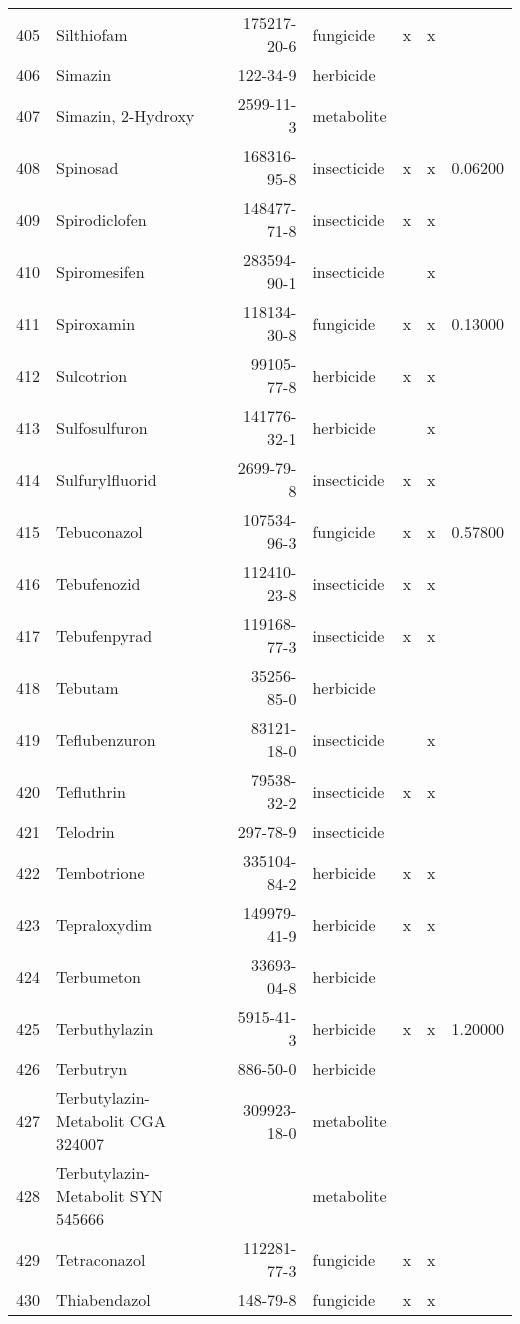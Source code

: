 \begin{longtable}{lp{3cm}rlp{1cm}p{1cm}p{1.5cm}}
  405 & Silthiofam & 175217-20-6 & fungicide & x & x &  \\ 
  406 & Simazin & 122-34-9 & herbicide &  &  &  \\ 
  407 & Simazin, 2-Hydroxy & 2599-11-3 & metabolite &  &  &  \\ 
  408 & Spinosad & 168316-95-8 & insecticide & x & x & 0.06200 \\ 
  409 & Spirodiclofen & 148477-71-8 & insecticide & x & x &  \\ 
  410 & Spiromesifen & 283594-90-1 & insecticide &  & x &  \\ 
  411 & Spiroxamin & 118134-30-8 & fungicide & x & x & 0.13000 \\ 
  412 & Sulcotrion & 99105-77-8 & herbicide & x & x &  \\ 
  413 & Sulfosulfuron & 141776-32-1 & herbicide &  & x &  \\ 
  414 & Sulfurylfluorid & 2699-79-8 & insecticide & x & x &  \\ 
  415 & Tebuconazol & 107534-96-3 & fungicide & x & x & 0.57800 \\ 
  416 & Tebufenozid & 112410-23-8 & insecticide & x & x &  \\ 
  417 & Tebufenpyrad & 119168-77-3 & insecticide & x & x &  \\ 
  418 & Tebutam & 35256-85-0 & herbicide &  &  &  \\ 
  419 & Teflubenzuron & 83121-18-0 & insecticide &  & x &  \\ 
  420 & Tefluthrin & 79538-32-2 & insecticide & x & x &  \\ 
  421 & Telodrin & 297-78-9 & insecticide &  &  &  \\ 
  422 & Tembotrione & 335104-84-2 & herbicide & x & x &  \\ 
  423 & Tepraloxydim & 149979-41-9 & herbicide & x & x &  \\ 
  424 & Terbumeton & 33693-04-8 & herbicide &  &  &  \\ 
  425 & Terbuthylazin & 5915-41-3 & herbicide & x & x & 1.20000 \\ 
  426 & Terbutryn & 886-50-0 & herbicide &  &  &  \\ 
  427 & Terbutylazin-Metabolit CGA 324007 & 309923-18-0 & metabolite &  &  &  \\ 
  428 & Terbutylazin-Metabolit SYN 545666 &  & metabolite &  &  &  \\ 
  429 & Tetraconazol & 112281-77-3 & fungicide & x & x &  \\ 
  430 & Thiabendazol & 148-79-8 & fungicide & x & x &  \\ 

\end{longtable}
